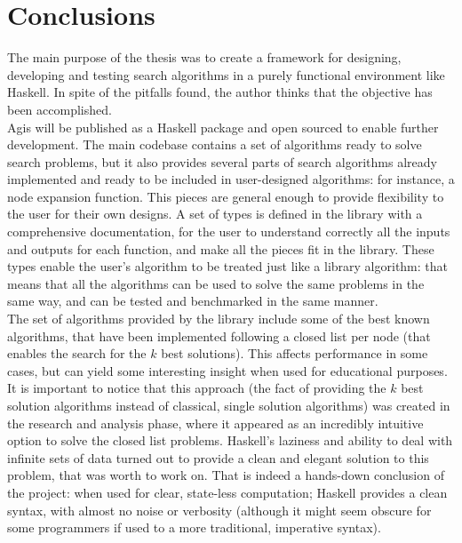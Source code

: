 \section{Conclusions}

The main purpose of the thesis was to create a framework for designing,
developing and testing search algorithms in a purely functional environment
like Haskell. In spite of the pitfalls found, the author thinks that the
objective has been accomplished.\\

Agis will be published as a Haskell package and open sourced to enable further
development. The main codebase contains a set of algorithms ready to solve
search problems, but it also provides several parts of search algorithms
already implemented and ready to be included in user-designed algorithms: for
instance, a node expansion function. This pieces are general enough to provide
flexibility to the user for their own designs. A set of types is defined in the
library with a comprehensive documentation, for the user to understand
correctly all the inputs and outputs for each function, and make all the pieces
fit in the library. These types enable the user's algorithm to be treated just
like a library algorithm: that means that all the algorithms can be used to
solve the same problems in the same way, and can be tested and benchmarked in
the same manner.\\

The set of algorithms provided by the library include some of the best known
algorithms, that have been implemented following a closed list per node (that
enables the search for the $k$ best solutions). This affects performance in
some cases, but can yield some interesting insight when used for educational
purposes. It is important to notice that this approach (the fact of providing
the $k$ best solution algorithms instead of classical, single solution
algorithms) was created in the research and analysis phase, where it appeared
as an incredibly intuitive option to solve the closed list problems. Haskell's
laziness and ability to deal with infinite sets of data turned out to provide a
clean and elegant solution to this problem, that was worth to work on. That is
indeed a hands-down conclusion of the project: when used for clear, state-less
computation; Haskell provides a clean syntax, with almost no noise or verbosity
(although it might seem obscure for some programmers if used to a more
traditional, imperative syntax).\\

